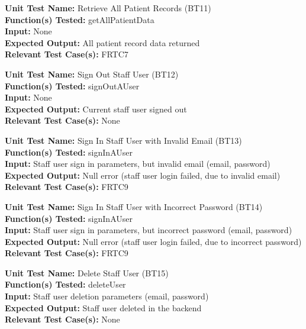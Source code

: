 \documentclass[12pt, titlepage]{article}
\begin{document}
\begin{mdframed}[linewidth=0.5mm]
  \textbf{Unit Test Name:} Retrieve All Patient Records (BT11) \\
  \textbf{Function(s) Tested:} getAllPatientData \\
  \textbf{Input:} None \\
  \textbf{Expected Output:} All patient record data returned \\
  \textbf{Relevant Test Case(s):} FRTC7
\end{mdframed}

\begin{mdframed}[linewidth=0.5mm]
  \textbf{Unit Test Name:} Sign Out Staff User (BT12) \\
  \textbf{Function(s) Tested:} signOutAUser \\
  \textbf{Input:} None \\
  \textbf{Expected Output:} Current staff user signed out \\
  \textbf{Relevant Test Case(s):} None
\end{mdframed}

\begin{mdframed}[linewidth=0.5mm]
  \textbf{Unit Test Name:} Sign In Staff User with Invalid Email (BT13) \\
  \textbf{Function(s) Tested:} signInAUser \\
  \textbf{Input:} Staff user sign in parameters, but invalid email (email, password) \\
  \textbf{Expected Output:} Null error (staff user login failed, due to invalid email) \\
  \textbf{Relevant Test Case(s):} FRTC9
\end{mdframed}

\begin{mdframed}[linewidth=0.5mm]
  \textbf{Unit Test Name:} Sign In Staff User with Incorrect Password (BT14) \\
  \textbf{Function(s) Tested:} signInAUser \\
  \textbf{Input:} Staff user sign in parameters, but incorrect password (email, password) \\
  \textbf{Expected Output:} Null error (staff user login failed, due to incorrect password) \\
  \textbf{Relevant Test Case(s):} FRTC9
\end{mdframed}

\begin{mdframed}[linewidth=0.5mm]
  \textbf{Unit Test Name:} Delete Staff User (BT15) \\
  \textbf{Function(s) Tested:} deleteUser \\
  \textbf{Input:} Staff user deletion parameters (email, password) \\
  \textbf{Expected Output:} Staff user deleted in the backend \\
  \textbf{Relevant Test Case(s):} None
\end{mdframed}
\end{document}
